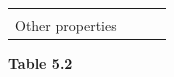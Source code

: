 \begin{enumerate}[noitemsep, label=\textbf{\arabic*}. ]
{\begin{center}
\begin{xtabular*}{\mytablewidth}[t]{|p{10\mystarwidth}|p{10\mystarwidth}|p{10\mystarwidth}|p{10\mystarwidth}|}
    
         &
    
    
         &
    
    
     \tabularnewline{}
    
    
        Other properties &
    
    
         &
    
    
         &
    
    
     \tabularnewline{}
    \end{xtabular*}
      \end{center}
    \begin{center}{\small\bfseries Table 5.2}\end{center}
    
}
\end{enumerate}
